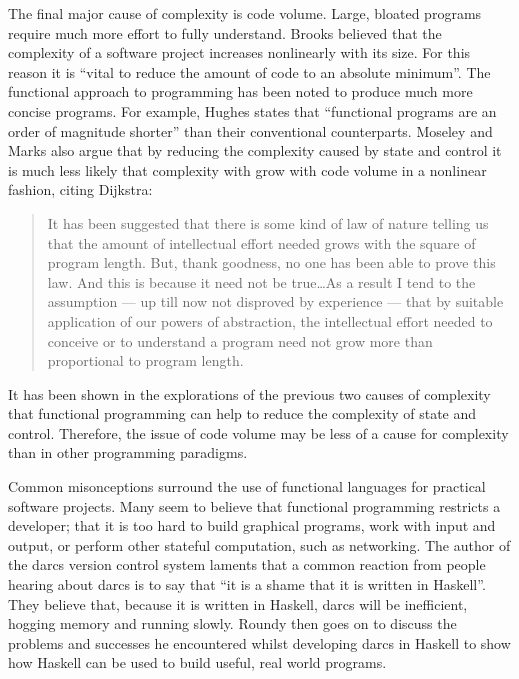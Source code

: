 The final major cause of complexity is code volume. Large, bloated programs
require much more effort to fully understand. Brooks believed that the complexity
of a software project increases nonlinearly with its size.\cite[1em]{brooks1987bullet}
For this reason it is ``vital to reduce the amount of code to an absolute
minimum''.\cite[1em]{moseley2006tarpit} The functional approach to programming
has been noted to produce much more concise programs. For example, Hughes
states that ``functional programs are an order of magnitude shorter'' than
their conventional counterparts.\cite[1em]{hughes1989whyfp} Moseley and Marks
also argue that by reducing the complexity caused by state and control it
is much less likely that complexity with grow with code volume in a nonlinear
fashion, citing Dijkstra:\cite[1em]{dijkstra1972humble}

\begin{quote}
It has been suggested that there is some kind of law of nature telling us that
the amount of intellectual effort needed grows with the square of program length.
But, thank goodness, no one has been able to prove this law. And this is because
it need not be true\ldots As a result I tend to the assumption --- up till now
not disproved by experience --- that by suitable application of our powers of
abstraction, the intellectual effort needed to conceive or to understand a program
need not grow more than proportional to program length.
\end{quote}
\noindent
It has been shown in the explorations of the previous two causes of complexity
that functional programming can help to reduce the complexity of state and
control. Therefore, the issue of code volume may be less of a cause for complexity
than in other programming paradigms.

Common misonceptions surround the use of functional languages for practical
software projects. Many seem to believe that functional programming restricts
a developer; that it is too hard to build graphical programs, work with input
and output, or perform other stateful computation, such as networking.
The author of the darcs version control system laments that a common reaction
from people hearing about darcs is to say that ``it is a shame that it is
written in Haskell''.\cite{roundy2005darcs} They believe that, because it is
written in Haskell, darcs will be inefficient, hogging memory and running slowly.
Roundy then goes on to discuss the problems and successes he encountered whilst
developing darcs in Haskell to show how Haskell can be used to build useful, real
world programs.

